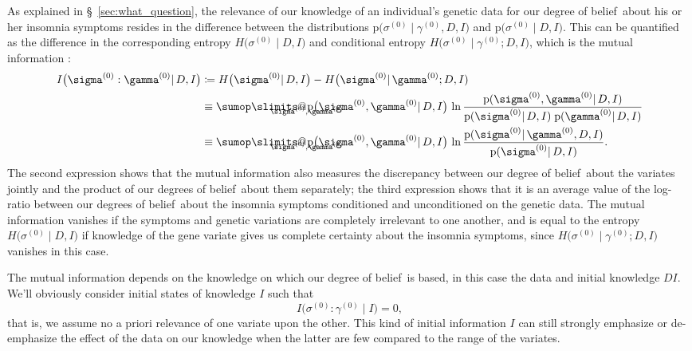 \documentclass[\ifafour a4paper,12pt,\else a5paper,10pt,\fi%
onecolumn,oneside,article,%
british%
]{memoir}
\makeatletter
\theoremstyle{remark}
\theoremstyle{innote}
\def\sum{\DOTSI\sumop\slimits@}
\newcommand*{\citep}{\parencites}
\newcommand*{\defd}{\coloneqq}
\newcommand*{\pf}{\mathrm{p}}%
\renewcommand*{\|}{\mathpunct{|}}
\newcommand*{\sect}{\S}%
\newcommand*{\chap}{ch.}%
\newcommand*{\dob}{degree of belief}
\newcommand*{\dobs}{degrees of belief}
\newcommand*{\yD}{D}
\newcommand*{\yI}{I}
\newcommand*{\sH}{H}
\newcommand*{\mI}{I}
\newcommand*{\ys}{\sigma}
\newcommand*{\yg}{\gamma}
\newcommand*{\ysi}[1]{\ys^{(#1)}}
\newcommand*{\ygi}[1]{\yg^{(#1)}}
\newcommand*{\yso}{\ysi{0}}
\newcommand*{\ygo}{\ygi{0}}
\makeatother
\begin{document}
As explained in \sect~\ref{sec:what_question}, the relevance of our
knowledge of an individual's genetic data for our \dob\ about his or her
insomnia symptoms resides in the difference between the distributions
$\pf\bigl(\yso\| \ygo, \yD, \yI\bigr)$ and
$\pf\bigl(\yso \| \yD, \yI\bigr)$. This can be quantified as the difference
in the corresponding entropy $\sH\bigl(\yso \| \yD,\yI\bigr)$
and conditional entropy
$\sH\bigl(\yso \| \ygo; \yD,\yI)$, which is the
mutual information \citep[in these called
\enquote{rate of
  transmission}]{shannon1948,kelly1956}[\sect~14.7]{pressetal1988_r2007}[\chap~2]{coveretal1991_r2006}:
\begin{equation}
  \label{eq:mutual_info_new_ind}
  \begin{split}
  \mI\bigl( \ysi{0} : \ygi{0} \| \yD,\yI \bigr) &\defd
  \sH\bigl(\yso \| \yD,\yI\bigr) -
  \sH\bigl(\yso \| \ygo; \yD,\yI)
  \\
  &\equiv
  \sum_{\mathclap{\ysi{0},\ygi{0}}} \pf\bigl(\ysi{0}, \ygi{0} \| \yD, \yI\bigr)
 \, \ln\frac{\pf(\ysi{0}, \ygi{0} \| \yD, \yI)}{
    \pf(\ysi{0} \| \yD, \yI)\;
    \pf(\ygi{0} \| \yD, \yI)}
  \\
  &\equiv
  \sum_{\mathclap{\ysi{0},\ygi{0}}} \pf\bigl(\ysi{0}, \ygi{0} \| \yD, \yI\bigr)
 \, \ln\frac{\pf(\ysi{0}\| \ygi{0}, \yD, \yI)}{
    \pf(\ysi{0} \| \yD, \yI)}.
\end{split}
\end{equation}
The second expression shows that the mutual information also measures the
discrepancy between our \dob\ about the variates jointly and the product of
our \dobs\ about them separately; the third expression shows that it is an
average value of the log-ratio between our \dobs\ about the insomnia
symptoms conditioned and unconditioned on the genetic data. The mutual
information vanishes if the symptoms and genetic variations are completely
irrelevant to one another, and is equal to the entropy
$\sH\bigl(\yso \| \yD,\yI\bigr)$ %
if knowledge of the gene variate gives us complete certainty about the
insomnia symptoms, since $\sH\bigl(\yso \| \ygo; \yD,\yI)$ vanishes in this
case.


The mutual information depends on the knowledge on which our \dob\ is
based, in this case the data and initial knowledge $\yD\yI$. We'll
obviously consider initial states of knowledge $\yI$ such that
\begin{equation}
\mI\bigl( \ysi{0} : \ygi{0} \| \yI \bigr) =0,
\end{equation}
that is, we assume no a priori relevance of one variate upon the other.
This kind of initial information $\yI$ can still strongly emphasize or
de-emphasize the effect of the data on our knowledge when the latter are
few compared to the range of the variates.
\end{document}
